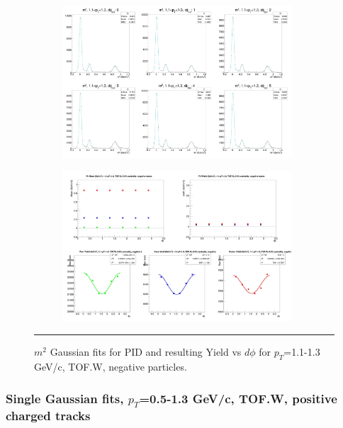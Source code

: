 \begin{figure}[H]
  \centering
    \begin{subfigure}[p]{1\textwidth}
   \centering
   \includegraphics[width=0.94\textwidth]{lowptfits/yieldvsdphi_tof1_cent0_ch0_pT-11-13.jpg}
    \end{subfigure}
    \begin{subfigure}[p]{1\textwidth}
   \centering
   \includegraphics[width=0.94\textwidth]{lowptfits/fitParams_tof1_cent0_ch0_pT-11-13.jpg}
    \end{subfigure}
    \rule{35em}{0.5pt}
  \caption[PID fits and Yield vs $d\phi$ for $p_T$=1.1-1.3 GeV/c, TOF.W, negative particles. ]{$m^2$ Gaussian fits for PID and resulting Yield vs $d\phi$ for $p_T$=1.1-1.3 GeV/c, TOF.W, negative particles.}
  \label{fig:fits11-13neg}
\end{figure}

\subsubsection{Single Gaussian fits, $p_T$=0.5-1.3 GeV/c, TOF.W, positive charged tracks}

